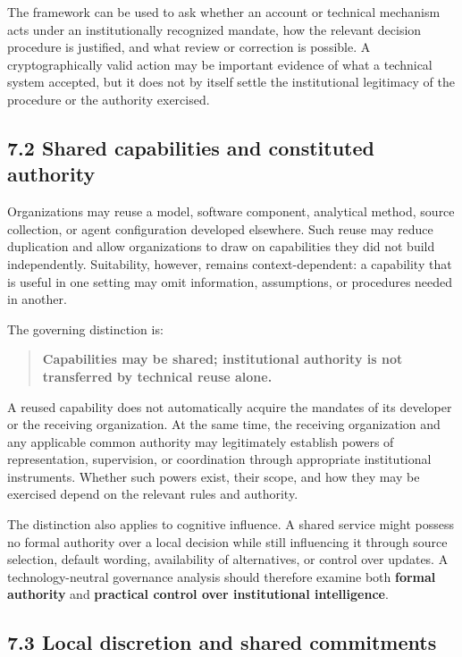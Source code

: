 \documentclass[
  10pt,
]{article}
\begin{document}
The framework can be used to ask whether an account or technical
mechanism acts under an institutionally recognized mandate, how the
relevant decision procedure is justified, and what review or correction
is possible. A cryptographically valid action may be important evidence
of what a technical system accepted, but it does not by itself settle
the institutional legitimacy of the procedure or the authority
exercised.

\subsection{7.2 Shared capabilities and constituted
authority}\label{shared-capabilities-and-constituted-authority}

Organizations may reuse a model, software component, analytical method,
source collection, or agent configuration developed elsewhere. Such
reuse may reduce duplication and allow organizations to draw on
capabilities they did not build independently. Suitability, however,
remains context-dependent: a capability that is useful in one setting
may omit information, assumptions, or procedures needed in another.

The governing distinction is:

\begin{quote}
\textbf{Capabilities may be shared; institutional authority is not
transferred by technical reuse alone.}
\end{quote}

A reused capability does not automatically acquire the mandates of its
developer or the receiving organization. At the same time, the receiving
organization and any applicable common authority may legitimately
establish powers of representation, supervision, or coordination through
appropriate institutional instruments. Whether such powers exist, their
scope, and how they may be exercised depend on the relevant rules and
authority.

The distinction also applies to cognitive influence. A shared service
might possess no formal authority over a local decision while still
influencing it through source selection, default wording, availability
of alternatives, or control over updates. A technology-neutral
governance analysis should therefore examine both \textbf{formal
authority} and \textbf{practical control over institutional
intelligence}.

\subsection{7.3 Local discretion and shared
commitments}\label{local-discretion-and-shared-commitments}
\end{document}
